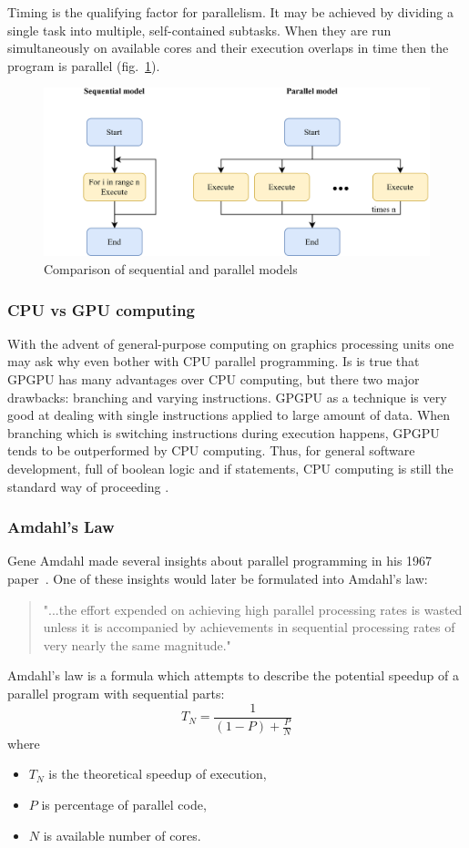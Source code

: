 Timing is the qualifying factor for parallelism. It may be achieved by dividing a single task into multiple, self-contained subtasks. When they are run simultaneously on available cores and their execution overlaps in time then the program is parallel (fig.~\ref{fig:seqvspar}).
\begin{figure}[htb]
	\centering
		\includegraphics[scale=1.0]{figures02/seqvspar.png}
		\caption{Comparison of sequential and parallel models}
	\label{fig:seqvspar}
\end{figure}

\subsubsection{CPU vs GPU computing}
With the advent of general-purpose computing on graphics processing units one may ask why even bother with CPU parallel programming. Is is true that GPGPU has many advantages over CPU computing, but there two major drawbacks: branching and varying instructions. GPGPU as a technique is very good at dealing with single instructions applied to large amount of data. When branching which is switching instructions during execution happens, GPGPU tends to be outperformed by CPU computing. Thus, for general software development, full of boolean logic and if statements, CPU computing is still the standard way of proceeding \cite{Tarditi2006}.

\subsubsection{Amdahl's Law}
Gene Amdahl made several insights about parallel programming in his 1967 paper~\cite{Amdahl1967}. One of these insights would later be formulated into Amdahl's law:
\begin{quotation}
"...the effort expended on achieving high parallel processing rates is wasted unless it is accompanied by achievements in sequential processing rates of very nearly the same magnitude."
\end{quotation}
Amdahl's law is a formula which attempts to describe the potential speedup of a parallel program with sequential parts: 
\begin{equation}
T_N = \frac{1}{(1 - P) + \frac{P}{N}}
\end{equation}
where
\begin{itemize}
	\item $T_N$ is the theoretical speedup of execution,
	\item $P$ is percentage of parallel code,
	\item $N$ is available number of cores.
\end{itemize}

